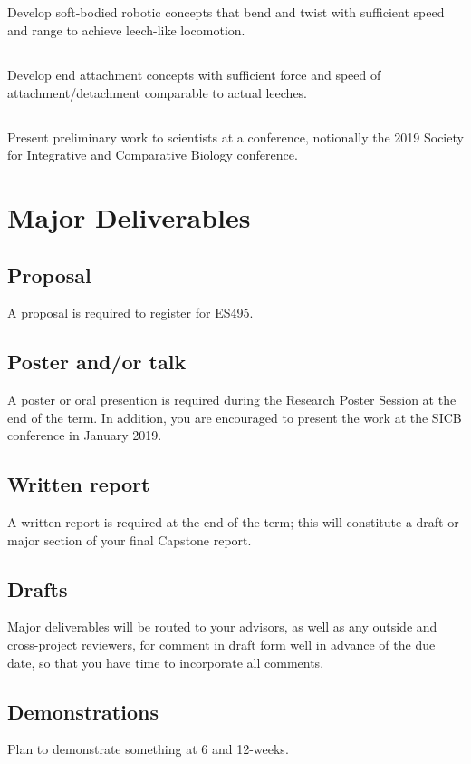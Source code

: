 \documentclass[10pt,courier]{navymemo}
\begin{document}
\subsection{} Develop soft-bodied robotic concepts that bend and twist with sufficient speed and range to achieve leech-like locomotion. 
\subsection{} Develop end attachment concepts with sufficient force and speed of attachment/detachment comparable to actual leeches. 
\subsection{} Present preliminary work to scientists at a conference, notionally the 2019 Society for Integrative and Comparative Biology conference. 

\section{Major Deliverables}
\subsection{Proposal} A proposal is required to register for ES495. 
\subsection{Poster and/or talk} A poster or oral presention is required during the Research Poster Session at the end of the term. In addition, you are encouraged to present the work at the SICB conference in January 2019. 
\subsection{Written report} A written report is required at the end of the term; this will constitute a draft or major section of your final Capstone report. 
\subsection{Drafts} Major deliverables will be routed to your advisors, as well as any outside and cross-project reviewers, for comment in draft form well in advance of the due date, so that you have time to incorporate all comments. 
\subsection{Demonstrations} Plan to demonstrate something at 6 and 12-weeks. 
\end{document}
